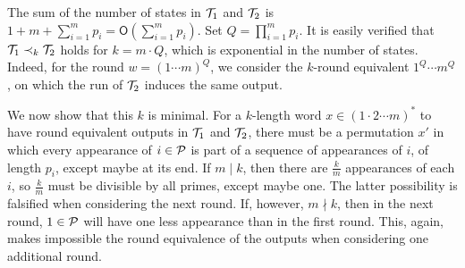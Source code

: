 \begin{example}

The sum of the number of states in $\mathcal{T}_1$ and $\mathcal{T}_2$ is $1+m+\sum_{i=1}^m p_i = \mathsf{O}\left(\sum_{i=1}^m p_i\right)$. Set $Q=\prod_{i=1}^m p_i$. It is easily verified that $\mathcal{T}_1\prec_k \mathcal{T}_2$ holds for $k = m\cdot Q$, which is exponential in the number of states. Indeed, for the round $w=(1\cdots m)^{Q}$, we consider the $k$-round equivalent $1^{Q}\cdots m^{Q}$, on which the run of $\mathcal{T}_2$ induces the same output.

We now show that this $k$ is minimal.
For a $k$-length word $x\in (1\cdot 2\cdots m)^*$ to have round equivalent outputs in $\mathcal{T}_1$ and $\mathcal{T}_2$, there must be a permutation $x'$ in which every appearance of $i\in\mathcal{P}$ is part of a sequence of appearances of $i$, of length $p_i$, except maybe at its end. If $m\mid k$, then there are $\frac{k}{m}$ appearances of each $i$, so $\frac{k}{m}$ must be divisible by all primes, except maybe one. The latter possibility is falsified when considering the next round. If, however, $m\nmid k$, then in the next round, $1\in\mathcal{P}$ will have one less appearance than in the first round. This, again, makes impossible the round equivalence of the outputs when considering one additional round.

\end{example}
